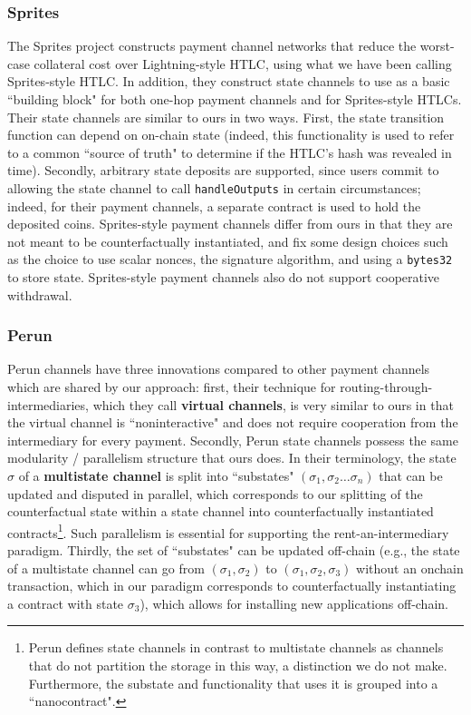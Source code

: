 \documentclass[prb,floatfix,reprint,nofootinbib,amsmath,amssymb,epsfig,pre,floats,letterpaper,groupedaffiliation,tightenlines,allcolors=blue,11pt]{revtex4}
\theoremstyle{definition}
\theoremstyle{definition}
\theoremstyle{definition}
\begin{document}
\subsubsection{Sprites}

The Sprites project \cite{sprites} constructs payment channel networks that reduce the worst-case collateral cost over Lightning-style HTLC, using what we have been calling Sprites-style HTLC. In addition, they construct state channels to use as a basic ``building block" for both one-hop payment channels and for Sprites-style HTLCs. Their state channels are similar to ours in two ways. First, the state transition function can depend on on-chain state (indeed, this functionality is used to refer to a common ``source of truth" to determine if the HTLC's hash was revealed in time). Secondly, arbitrary state deposits are supported, since users commit to allowing the state channel to call \texttt{handleOutputs} in certain circumstances; indeed, for their payment channels, a separate contract is used to hold the deposited coins. Sprites-style payment channels differ from ours in that they are not meant to be counterfactually instantiated, and fix some design choices such as the choice to use scalar nonces, the signature algorithm, and using a \texttt{bytes32} to store state. Sprites-style payment channels also do not support cooperative withdrawal.

\subsubsection{Perun}
\label{sec:perun}

Perun channels have three innovations compared to other payment channels which are shared by our approach: first, their technique for routing-through-intermediaries, which they call \textbf{virtual channels}, is very similar to ours in that the virtual channel is ``noninteractive" and does not require cooperation from the intermediary for every payment. Secondly, Perun state channels possess the same modularity / parallelism structure that ours does. In their terminology, the state $\sigma$ of a \textbf{multistate channel} is split into ``substates" $(\sigma_1, \sigma_2 \ldots \sigma_n)$ that can be updated and disputed in parallel, which corresponds to our splitting of the counterfactual state within a state channel into counterfactually instantiated contracts\footnote{Perun defines state channels in contrast to multistate channels as channels that do not partition the storage in this way, a distinction we do not make. Furthermore, the substate and functionality that uses it is grouped into a ``nanocontract".}. Such parallelism is essential for supporting the rent-an-intermediary paradigm. Thirdly, the set of ``substates" can be updated off-chain (e.g., the state of a multistate channel can go from $(\sigma_1, \sigma_2)$ to $(\sigma_1, \sigma_2, \sigma_3)$ without an onchain transaction, which in our paradigm corresponds to counterfactually instantiating a contract with state $\sigma_3$), which allows for installing new applications off-chain.
\end{document}
